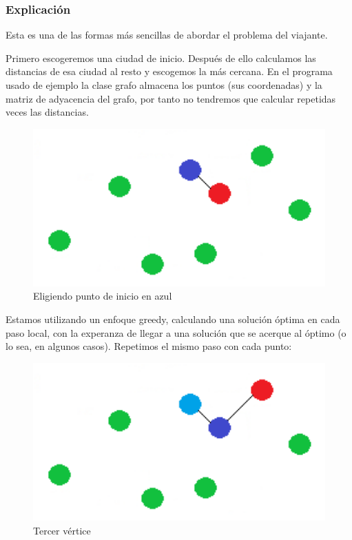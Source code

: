 \subsubsection{Explicación}
Esta es una de las formas más sencillas de abordar el problema del viajante.

Primero escogeremos una ciudad de inicio. Después de ello calculamos las distancias de esa ciudad al resto y escogemos la más cercana.
En el programa usado de ejemplo la clase grafo almacena los puntos (sus coordenadas) y la matriz de adyacencia del grafo, por tanto no 
tendremos que calcular repetidas veces las distancias.

\begin{figure}[htb] 
	\centering
	\includegraphics[width=1.75\textwidth]{./Imagenes/vecino1.png}
	\caption{Eligiendo punto de inicio en azul} 
\end{figure}

Estamos utilizando un enfoque greedy, calculando una solución óptima en cada paso local, con la experanza de llegar a una solución que se
acerque al óptimo (o lo sea, en algunos casos). Repetimos el mismo paso con cada punto:

\begin{figure}[htb] 
	\centering
	\includegraphics[width=1.75\textwidth]{./Imagenes/vecino2.png}
	\caption{Tercer vértice} 
\end{figure}

